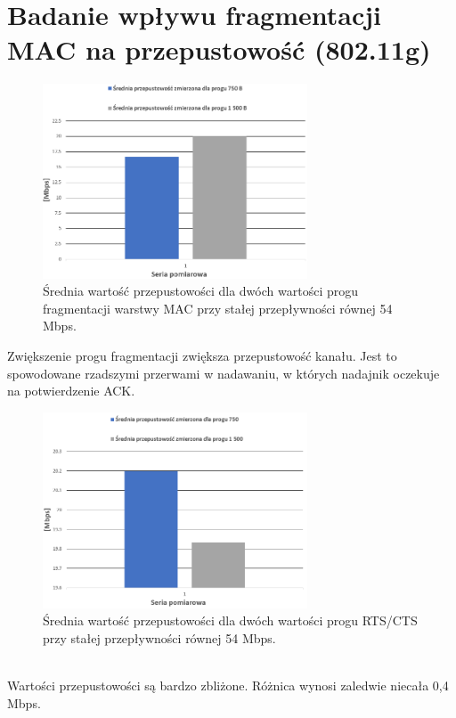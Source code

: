 \documentclass[12pt, a4paper, oneside]{article}
\begin{document}
\section{Badanie wpływu fragmentacji MAC na przepustowość (802.11g)}
\begin{figure}[h!]
\centering
\includegraphics[width=0.7\textwidth]{pics/f9.png}
\caption{Średnia wartość przepustowości dla dwóch wartości progu fragmentacji warstwy MAC przy stałej przepływności równej 54 Mbps.}
\end{figure}
\indent Zwiększenie progu fragmentacji zwiększa przepustowość kanału. Jest to spowodowane rzadszymi przerwami w nadawaniu, w których nadajnik oczekuje na potwierdzenie ACK.
\begin{figure}[h!]
\centering
\includegraphics[width=0.7\textwidth]{pics/f10.png}
\caption{Średnia wartość przepustowości dla dwóch wartości progu RTS/CTS przy stałej przepływności równej 54 Mbps.}
\end{figure}\\
\indent Wartości przepustowości są bardzo zbliżone. Różnica wynosi zaledwie niecała 0,4 Mbps.
\clearpage
\end{document}
